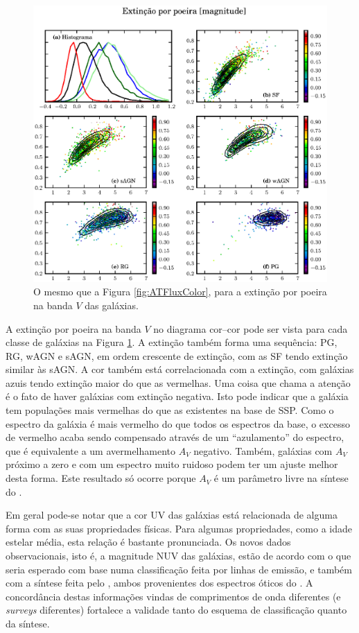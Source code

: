 \begin{figure}
	\includegraphics{figuras/uvcolor-color-AV-byclass.eps}
	\caption[Extinção por poeira no diagrama cor--cor.]
	{O mesmo que a Figura \ref{fig:ATFluxColor}, para a extinção por
	poeira na banda $V$ das galáxias.}
	\label{fig:AVColor}
\end{figure}

A extinção por poeira na banda $V$ no diagrama cor--cor pode ser vista para cada
classe de galáxias na Figura \ref{fig:AVColor}. A extinção também forma uma
sequência: PG, RG, wAGN e sAGN, em ordem crescente de extinção, com as SF tendo
extinção similar às sAGN. A cor também está correlacionada com a extinção, com
galáxias azuis tendo extinção maior do que as vermelhas. Uma coisa que chama a
atenção é o fato de haver galáxias com extinção negativa. Isto pode indicar que
a galáxia tem populações mais vermelhas do que as existentes na base de SSP.
Como o espectro da galáxia é mais vermelho do que todos os espectros da base, o
excesso de vermelho acaba sendo compensado através de um ``azulamento'' do
espectro, que é equivalente a um avermelhamento $A_V$ negativo. Também, galáxias
com $A_V$ próximo a zero e com um espectro muito ruidoso podem ter um ajuste
melhor desta forma. Este resultado só ocorre porque $A_V$ é um parâmetro livre
na síntese do \starlight.

Em geral pode-se notar que a cor UV das galáxias está relacionada de alguma
forma com as suas propriedades físicas. Para algumas propriedades, como a idade
estelar média, esta relação é bastante pronunciada. Os novos dados
observacionais, isto é, a magnitude NUV das galáxias, estão de acordo com o que
seria esperado com base numa classificação feita por linhas de emissão, e também
com a síntese feita pelo \starlight, ambos provenientes dos espectros óticos do
\SDSS. A concordância destas informações vindas de comprimentos de onda
diferentes (e {\em surveys} diferentes) fortalece a validade tanto do esquema de
classificação quanto da síntese.


